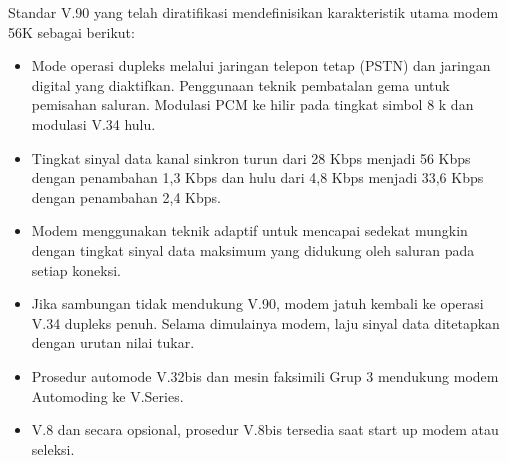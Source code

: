 Standar V.90 yang telah diratifikasi mendefinisikan karakteristik utama modem 56K sebagai berikut: 
\begin{itemize}
\item Mode operasi dupleks melalui jaringan telepon tetap (PSTN) dan jaringan digital yang diaktifkan. Penggunaan teknik pembatalan gema untuk pemisahan saluran. Modulasi PCM ke hilir pada tingkat simbol 8 k dan modulasi V.34 hulu.
\item Tingkat sinyal data kanal sinkron turun dari 28 Kbps menjadi 56 Kbps dengan penambahan 1,3 Kbps dan hulu dari 4,8 Kbps menjadi 33,6 Kbps dengan penambahan 2,4 Kbps.
\item Modem menggunakan teknik adaptif untuk mencapai sedekat mungkin dengan tingkat sinyal data maksimum yang didukung oleh saluran pada setiap koneksi. 
\item Jika sambungan tidak mendukung V.90, modem jatuh kembali ke operasi V.34 dupleks penuh. Selama dimulainya modem, laju sinyal data ditetapkan dengan urutan nilai tukar.
\item Prosedur automode V.32bis dan mesin faksimili Grup 3 mendukung modem Automoding ke V.Series. 
\item V.8 dan secara opsional, prosedur V.8bis tersedia saat start up modem atau seleksi. \cite{gao1998introduction} 
\end{itemize}
